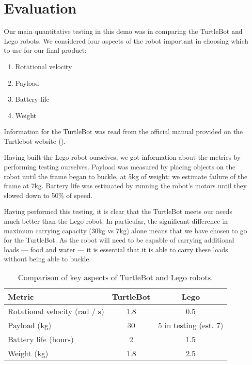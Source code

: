 \documentclass{article}
\begin{document}
\section{Evaluation}
Our main quantitative testing in this demo was in comparing the TurtleBot and Lego robots. We considered four aspects of the robot important in choosing which to use for our final product:
\begin{enumerate}
\item Rotational velocity
\item Payload
\item Battery life
\item Weight
\end{enumerate}

Information for the TurtleBot was read from the official manual provided on the Turtlebot website (\cite{turtle}).

Having built the Lego robot ourselves, we got information about the metrics by performing testing ourselves. Payload was measured by placing objects on the robot until the frame began to buckle, at 5kg of weight: we estimate failure of the frame at 7kg. Battery life was estimated by running the robot's motors until they slowed down to 50\% of speed. 

Having performed this testing, it is clear that the TurtleBot meets our needs much better than the Lego robot. In particular, the significant difference in maximum carrying capacity (30kg vs 7kg) alone means that we have chosen to go for the TurtleBot. As the robot will need to be capable of carrying additional loads --- food and water --- it is essential that it is able to carry these loads without being able to buckle.


\begin{table}[h]
\vskip 3mm
\begin{center}
\begin{small}
\begin{sc}
\begin{tabular}{lcc}
\hline
\abovespace\belowspace
Metric & TurtleBot & Lego \\
\hline
  Rotational velocity (rad / s) & 1.8 & 0.5 \\
  Payload (kg) & 30 & 5 in testing (est. 7) \\
  Battery life (hours) & 2 & 1.5 \\
  Weight (kg) & 1.8 & 2.5 
\end{tabular}
\end{sc}
\end{small}
\caption{Comparison of key aspects of TurtleBot and Lego robots.}
\label{tab:sample-table}
\end{center}
\vskip -3mm
\end{table}
\end{document}
